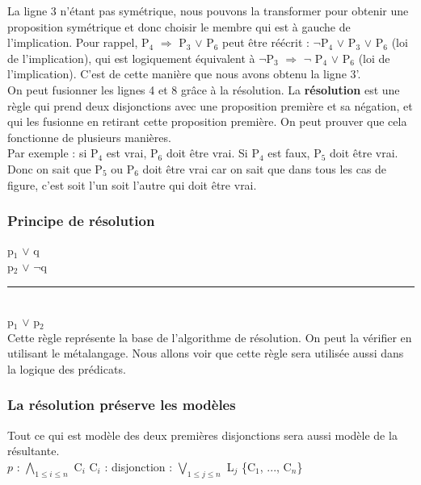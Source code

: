 La ligne 3 n'étant pas symétrique, nous pouvons la transformer pour obtenir une proposition symétrique et donc choisir le membre qui est à gauche de l'implication. Pour rappel, P$_{4}$ $\Rightarrow$ P$_{3}$ $\lor$ P$_{6}$ peut être réécrit  : $\lnot$P$_{4}$ $\lor$ P$_{3}$ $\lor$ P$_{6}$ (loi de l'implication), qui est logiquement équivalent à $\lnot$P$_{3}$ $\Rightarrow$ $\lnot$ P$_{4}$ $\lor$ P$_{6}$ (loi de l'implication). C'est de cette manière que nous avons obtenu la ligne 3'.\\

On peut fusionner les lignes 4 et 8 grâce à la résolution. La \textbf{résolution} est une règle qui prend deux disjonctions avec une proposition première et sa négation, et qui les fusionne en retirant cette proposition première. On peut prouver que cela fonctionne de plusieurs manières.\\ 
Par exemple : si P$_{4}$ est vrai, P$_{6}$ doit être vrai. Si P$_{4}$ est faux, P$_{5}$ doit être vrai. Donc on sait que P$_{5}$ ou P$_{6}$ doit être vrai car on sait que dans tous les cas de figure, c'est soit l'un soit l'autre qui doit être vrai. 


\subsubsection{Principe de résolution}
\noindent p$_{1}$ $\lor$ q \\
\noindent p$_{2}$ $\lor$ $\lnot$q \\
\rule{3cm}{0.4pt} \\
p$_{1}$ $\lor$ p$_{2}$
\\

Cette règle représente la base de l'algorithme de résolution.
On peut la vérifier en utilisant le métalangage.
Nous allons voir que cette règle sera utilisée aussi dans la logique des prédicats. 

\subsubsection{La résolution préserve les modèles}
\noindent Tout ce qui est modèle des deux premières disjonctions sera aussi modèle de la résultante. \\

\noindent $p$ : $\bigwedge\limits_{1 \leq i \leq n}$ C$_{i}$ \indent   \indent \indent \indent C$_{i}$ : disjonction : $\bigvee\limits_{1 \leq j \leq n}$ L$_{j}$ \indent  \{C$_{1}$, ..., C$_{n}$\}\\

